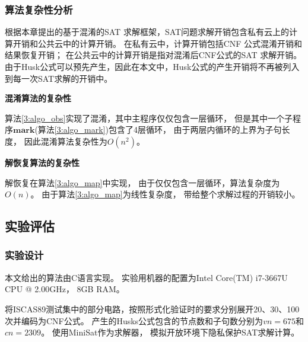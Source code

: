 \subsubsection{算法复杂性分析}
根据本章提出的基于混淆的SAT 求解框架，SAT问题求解开销包含私有云上的计算开销和公共云中的计算开销。
在私有云中，计算开销包括CNF 公式混淆开销和结果恢复开销；
在公共云中的计算开销是指对混淆后CNF公式的SAT 求解开销。
由于Husk公式可以预先产生，因此在本文中，Husk公式的产生开销将不再被列入到每一次SAT求解的开销中。

\textbf{混淆算法的复杂性}

算法\ref{3:algo_obs}实现了混淆，其中主程序仅仅包含一层循环，
但是其中一个子程序$\mathbf{mark}$(算法\ref{3:algo_mark})包含了4层循环，
由于两层内循环的上界为子句长度，
因此混淆算法复杂性为$O(n^2)$。

\textbf{解恢复算法的复杂性}

解恢复在算法\ref{3:algo_map}中实现，
由于仅仅包含一层循环，算法复杂度为$O(n)$。
由于算法\ref{3:algo_map}为线性复杂度，
带给整个求解过程的开销较小。

\subsection{实验评估}
\subsubsection{实验设计}
本文给出的算法由C语言实现。
实验用机器的配置为Intel Core(TM) i7-3667U CPU @ 2.00GHz， 8GB RAM。

将ISCAS89测试集中的部分电路，按照形式化验证时的要求分别展开20、30、100次并编码为CNF公式。
产生的Husks公式包含的节点数和子句数分别为$vn=675$和$cn=2309$。
使用MiniSat作为求解器，
模拟开放环境下隐私保护SAT求解计算。

